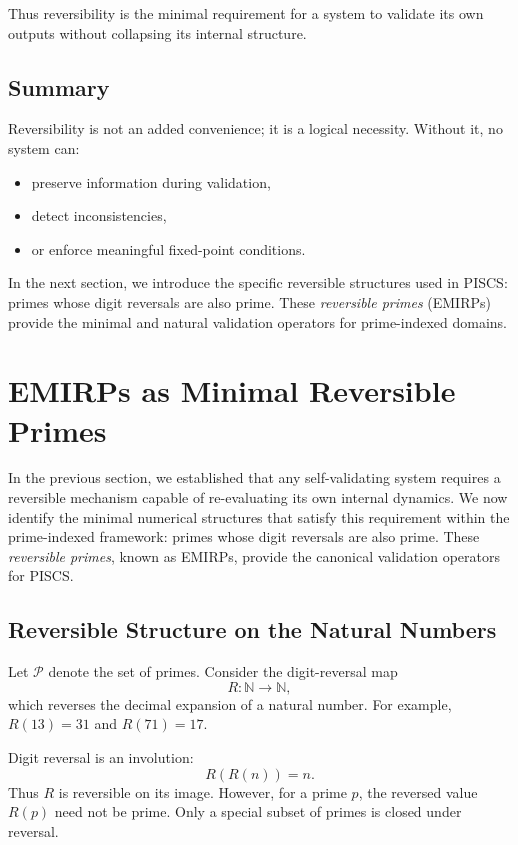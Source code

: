 \documentclass[11pt]{article}
\theoremstyle{definition}
\theoremstyle{plain}
\theoremstyle{remark}
\begin{document}
Thus reversibility is the minimal requirement for a system to validate
its own outputs without collapsing its internal structure.

\subsection{Summary}

Reversibility is not an added convenience; it is a logical necessity.
Without it, no system can:

\begin{itemize}
    \item preserve information during validation,
    \item detect inconsistencies,
    \item or enforce meaningful fixed-point conditions.
\end{itemize}

In the next section, we introduce the specific reversible structures
used in PISCS: primes whose digit reversals are also prime. These
\emph{reversible primes} (EMIRPs) provide the minimal and natural
validation operators for prime-indexed domains.

\section{EMIRPs as Minimal Reversible Primes}

In the previous section, we established that any self-validating system
requires a reversible mechanism capable of re-evaluating its own
internal dynamics. We now identify the minimal numerical structures that
satisfy this requirement within the prime-indexed framework: primes
whose digit reversals are also prime. These \emph{reversible primes},
known as EMIRPs, provide the canonical validation operators for PISCS.

\subsection{Reversible Structure on the Natural Numbers}

Let $\mathcal{P}$ denote the set of primes. Consider the digit-reversal
map
\[
R : \mathbb{N} \to \mathbb{N},
\]
which reverses the decimal expansion of a natural number. For example,
$R(13)=31$ and $R(71)=17$.

Digit reversal is an involution:
\[
R(R(n)) = n.
\]
Thus $R$ is reversible on its image. However, for a prime $p$, the
reversed value $R(p)$ need not be prime. Only a special subset of primes
is closed under reversal.
\end{document}
